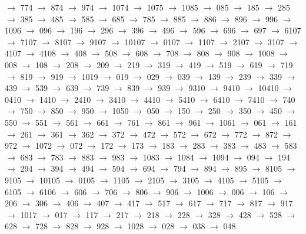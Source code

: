 $\rightarrow$ 774 $\rightarrow$ 874 $\rightarrow$ 974 $\rightarrow$ 1074 $\rightarrow$ 1075 $\rightarrow$ 1085 $\rightarrow$ 085 $\rightarrow$ 185 $\rightarrow$ 285 $\rightarrow$ 385 $\rightarrow$ 485 $\rightarrow$ 585 $\rightarrow$ 685 $\rightarrow$ 785 $\rightarrow$ 885 $\rightarrow$ 886 $\rightarrow$ 896 $\rightarrow$ 996 $\rightarrow$ 1096 $\rightarrow$ 096 $\rightarrow$ 196 $\rightarrow$ 296 $\rightarrow$ 396 $\rightarrow$ 496 $\rightarrow$ 596 $\rightarrow$ 696 $\rightarrow$ 697 $\rightarrow$ 6107 $\rightarrow$ 7107 $\rightarrow$ 8107 $\rightarrow$ 9107 $\rightarrow$ 10107 $\rightarrow$ 0107 $\rightarrow$ 1107 $\rightarrow$ 2107 $\rightarrow$ 3107 $\rightarrow$ 4107 $\rightarrow$ 4108 $\rightarrow$ 408 $\rightarrow$ 508 $\rightarrow$ 608 $\rightarrow$ 708 $\rightarrow$ 808 $\rightarrow$ 908 $\rightarrow$ 1008 $\rightarrow$ 008 $\rightarrow$ 108 $\rightarrow$ 208 $\rightarrow$ 209 $\rightarrow$ 219 $\rightarrow$ 319 $\rightarrow$ 419 $\rightarrow$ 519 $\rightarrow$ 619 $\rightarrow$ 719 $\rightarrow$ 819 $\rightarrow$ 919 $\rightarrow$ 1019 $\rightarrow$ 019 $\rightarrow$ 029 $\rightarrow$ 039 $\rightarrow$ 139 $\rightarrow$ 239 $\rightarrow$ 339 $\rightarrow$ 439 $\rightarrow$ 539 $\rightarrow$ 639 $\rightarrow$ 739 $\rightarrow$ 839 $\rightarrow$ 939 $\rightarrow$ 9310 $\rightarrow$ 9410 $\rightarrow$ 10410 $\rightarrow$ 0410 $\rightarrow$ 1410 $\rightarrow$ 2410 $\rightarrow$ 3410 $\rightarrow$ 4410 $\rightarrow$ 5410 $\rightarrow$ 6410 $\rightarrow$ 7410 $\rightarrow$ 740 $\rightarrow$ 750 $\rightarrow$ 850 $\rightarrow$ 950 $\rightarrow$ 1050 $\rightarrow$ 050 $\rightarrow$ 150 $\rightarrow$ 250 $\rightarrow$ 350 $\rightarrow$ 450 $\rightarrow$ 550 $\rightarrow$ 551 $\rightarrow$ 561 $\rightarrow$ 661 $\rightarrow$ 761 $\rightarrow$ 861 $\rightarrow$ 961 $\rightarrow$ 1061 $\rightarrow$ 061 $\rightarrow$ 161 $\rightarrow$ 261 $\rightarrow$ 361 $\rightarrow$ 362 $\rightarrow$ 372 $\rightarrow$ 472 $\rightarrow$ 572 $\rightarrow$ 672 $\rightarrow$ 772 $\rightarrow$ 872 $\rightarrow$ 972 $\rightarrow$ 1072 $\rightarrow$ 072 $\rightarrow$ 172 $\rightarrow$ 173 $\rightarrow$ 183 $\rightarrow$ 283 $\rightarrow$ 383 $\rightarrow$ 483 $\rightarrow$ 583 $\rightarrow$ 683 $\rightarrow$ 783 $\rightarrow$ 883 $\rightarrow$ 983 $\rightarrow$ 1083 $\rightarrow$ 1084 $\rightarrow$ 1094 $\rightarrow$ 094 $\rightarrow$ 194 $\rightarrow$ 294 $\rightarrow$ 394 $\rightarrow$ 494 $\rightarrow$ 594 $\rightarrow$ 694 $\rightarrow$ 794 $\rightarrow$ 894 $\rightarrow$ 895 $\rightarrow$ 8105 $\rightarrow$ 9105 $\rightarrow$ 10105 $\rightarrow$ 0105 $\rightarrow$ 1105 $\rightarrow$ 2105 $\rightarrow$ 3105 $\rightarrow$ 4105 $\rightarrow$ 5105 $\rightarrow$ 6105 $\rightarrow$ 6106 $\rightarrow$ 606 $\rightarrow$ 706 $\rightarrow$ 806 $\rightarrow$ 906 $\rightarrow$ 1006 $\rightarrow$ 006 $\rightarrow$ 106 $\rightarrow$ 206 $\rightarrow$ 306 $\rightarrow$ 406 $\rightarrow$ 407 $\rightarrow$ 417 $\rightarrow$ 517 $\rightarrow$ 617 $\rightarrow$ 717 $\rightarrow$ 817 $\rightarrow$ 917 $\rightarrow$ 1017 $\rightarrow$ 017 $\rightarrow$ 117 $\rightarrow$ 217 $\rightarrow$ 218 $\rightarrow$ 228 $\rightarrow$ 328 $\rightarrow$ 428 $\rightarrow$ 528 $\rightarrow$ 628 $\rightarrow$ 728 $\rightarrow$ 828 $\rightarrow$ 928 $\rightarrow$ 1028 $\rightarrow$ 028 $\rightarrow$ 038 $\rightarrow$ 048 